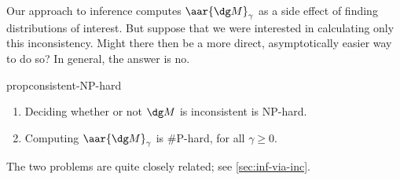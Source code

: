 
Our approach to inference computes
 $\aar{\dg M}_\gamma$ as a side effect of finding distributions of 
interest.
But suppose that we were interested in calculating only this inconsistency.
Might there then be a more direct, asymptotically easier way 
to do so?
In general, the answer is no.

\begin{linked}{prop}{consistent-NP-hard}%
    \begin{enumerate}[nosep,label={\rm{(\alph*)}}]
    \item Deciding whether or not $\dg M$ is inconsistent is NP-hard.
    \item Computing $\aar{\dg M}_\gamma$ is \#P-hard, for all $\gamma \ge 0$.
    \end{enumerate}
\end{linked}

The two problems are quite closely related; see \cref{sec:inf-via-inc}.

